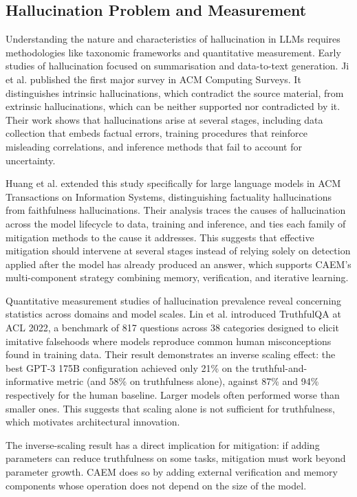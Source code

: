 \subsection{Hallucination Problem and Measurement}

Understanding the nature and characteristics of hallucination in LLMs requires methodologies like taxonomic frameworks and quantitative measurement. Early studies of hallucination focused on summarisation and data-to-text generation. Ji et al. \cite{ji2023survey} published the first major survey in ACM Computing Surveys. It distinguishes intrinsic hallucinations, which contradict the source material, from extrinsic hallucinations, which can be neither supported nor contradicted by it. Their work shows that hallucinations arise at several stages, including data collection that embeds factual errors, training procedures that reinforce misleading correlations, and inference methods that fail to account for uncertainty.

Huang et al. \cite{huang2025survey} extended this study specifically for large language models in ACM Transactions on Information Systems, distinguishing factuality hallucinations from faithfulness hallucinations. Their analysis traces the causes of hallucination across the model lifecycle to data, training and inference, and ties each family of mitigation methods to the cause it addresses. This suggests that effective mitigation should intervene at several stages instead of relying solely on detection applied after the model has already produced an answer, which supports CAEM's multi-component strategy combining memory, verification, and iterative learning.

Quantitative measurement studies of hallucination prevalence reveal concerning statistics across domains and model scales. Lin et al. \cite{lin-etal-2022-truthfulqa} introduced TruthfulQA at ACL 2022, a benchmark of 817 questions across 38 categories designed to elicit imitative falsehoods where models reproduce common human misconceptions found in training data. Their result demonstrates an inverse scaling effect: the best GPT-3 175B configuration achieved only 21\% on the truthful-and-informative metric (and 58\% on truthfulness alone), against 87\% and 94\% respectively for the human baseline. Larger models often performed worse than smaller ones. This suggests that scaling alone is not sufficient for truthfulness, which motivates architectural innovation.

The inverse-scaling result has a direct implication for mitigation: if adding parameters can reduce truthfulness on some tasks, mitigation must work beyond parameter growth. CAEM does so by adding external verification and memory components whose operation does not depend on the size of the model.


